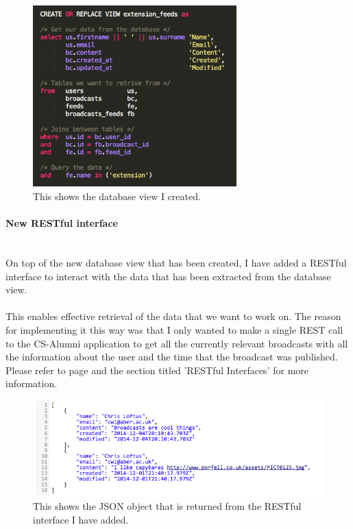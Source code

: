 \documentclass{article}
\newcommand{\myparagraph}[1]{\paragraph{#1}\mbox{}\\}
\begin{document}
\begin{figure}[H]
\centering
\includegraphics[width=0.7\textwidth]{sqlview}
\caption{This shows the database view I created.}
\end{figure}

\myparagraph{New RESTful interface}
On top of the new database view that has been created, I have added a RESTful interface to interact with the data that has been extracted from the database view. \\
\\
This enables effective retrieval of the data that we want to work on. The reason for implementing it this way was that I only wanted to make a single REST call to the CS-Alumni application to get all the currently relevant broadcasts with all the information about the user and the time that the broadcast was published.
\\ 
Please refer to page \pageref{sec:technology} and the section titled 'RESTful Interfaces' for more information.

\begin{figure}[H]
\centering
\includegraphics[width=\textwidth]{broadcastrest}
\caption{This shows the JSON object that is returned from the RESTful interface I have added.}
\end{figure}
\end{document}
